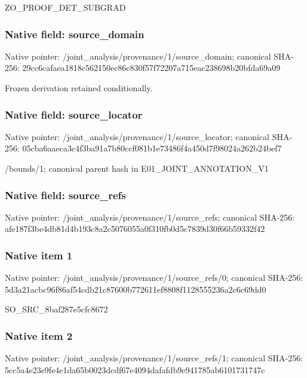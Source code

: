 \documentclass[10pt,a4paper]{article}
\begin{document}
\begingroup\raggedright\sloppy ZO\_\allowbreak{}PROOF\_\allowbreak{}DET\_\allowbreak{}SUBGRAD\par\endgroup

\subsubsection{Native field: source\_\allowbreak{}domain}
Native pointer: /joint\_\allowbreak{}analysis/provenance/1/source\_\allowbreak{}domain; canonical SHA-256: 29cc6cafaea1818c562150ec86c830f57f72207a715eac238698b20bfda69a09

\begingroup\raggedright\sloppy Frozen derivation retained conditionally.\par\endgroup

\subsubsection{Native field: source\_\allowbreak{}locator}
Native pointer: /joint\_\allowbreak{}analysis/provenance/1/source\_\allowbreak{}locator; canonical SHA-256: 05cba6aaeca3c4f3ba91a7b80ccf081b1e73486f4a450d7f98024a262b24bef7

\begingroup\raggedright\sloppy /\allowbreak{}bounds/\allowbreak{}1;\allowbreak{} canonical parent hash in E01\_\allowbreak{}JOINT\_\allowbreak{}ANNOTATION\_\allowbreak{}V1\par\endgroup

\subsubsection{Native field: source\_\allowbreak{}refs}
Native pointer: /joint\_\allowbreak{}analysis/provenance/1/source\_\allowbreak{}refs; canonical SHA-256: afe187f3be4db81d4b193c8a2c5076055a0f310fb0d5c7839d30f66b59332f42

\subsubsection{Native item 1}
Native pointer: /joint\_\allowbreak{}analysis/provenance/1/source\_\allowbreak{}refs/0; canonical SHA-256: 5d3a21acbc96f86af54cdb21c87600b772611ef8808f1128555236a2c6c69dd0

\begingroup\raggedright\sloppy SO\_\allowbreak{}SRC\_\allowbreak{}8baf287e5cfc8672\par\endgroup

\subsubsection{Native item 2}
Native pointer: /joint\_\allowbreak{}analysis/provenance/1/source\_\allowbreak{}refs/1; canonical SHA-256: 5cc5a4e23e9fe4e1da65b0023dcdf67e4094dafafdb9e941785ab6101731747c
\end{document}
